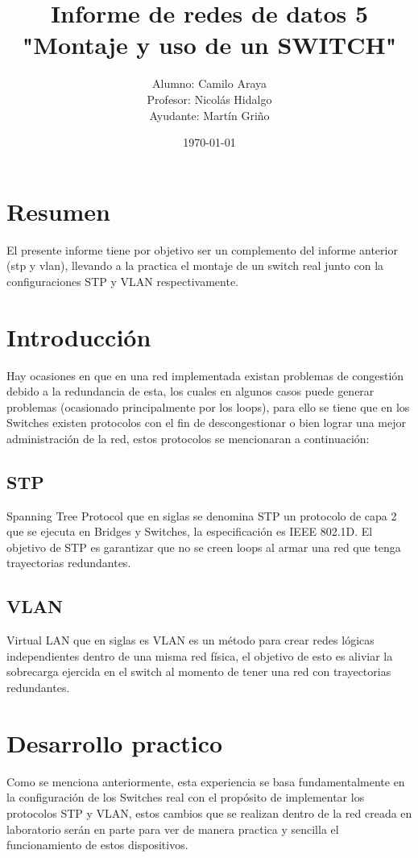 \documentclass[spanish]{udpreport}
\title{Informe de redes de datos 5\\
"Montaje y uso de un SWITCH"\\}
\author{Alumno: Camilo Araya
\\Profesor: Nicolás Hidalgo\\Ayudante: Martín Griño}
\date{\today}
\begin{document}
\maketitle

\chapter*{Resumen} 
El presente informe tiene por objetivo ser un complemento del informe anterior (stp y vlan), llevando a la practica el montaje de un switch real junto con la configuraciones STP y VLAN respectivamente.
\tableofcontents
\chapter{Introducción}
Hay ocasiones en que en una red implementada existan problemas de congestión debido a la redundancia de esta, los cuales en algunos casos puede generar problemas (ocasionado principalmente por los loops), para ello se tiene que en los Switches existen protocolos con el fin de descongestionar o bien lograr una mejor administración de la red, estos protocolos se mencionaran a continuación:
\section{STP}
Spanning Tree Protocol que en siglas se denomina STP un protocolo de capa 2 que se ejecuta en Bridges y Switches, la especificación es IEEE 802.1D. El objetivo de STP es garantizar que no se creen loops al armar una red que tenga trayectorias redundantes.
\section{VLAN}
Virtual LAN que en siglas es VLAN es un método para crear redes lógicas independientes dentro de una misma red física, el objetivo de esto es aliviar la sobrecarga ejercida en el switch al momento de tener una red con trayectorias redundantes.
\chapter{Desarrollo practico}
Como se menciona anteriormente, esta experiencia se basa fundamentalmente en la configuración de los Switches real con el propósito de implementar los protocolos STP y VLAN, estos cambios que se realizan dentro de la red creada en laboratorio serán en parte para ver de manera practica y sencilla  el funcionamiento de estos dispositivos.
\end{document}
